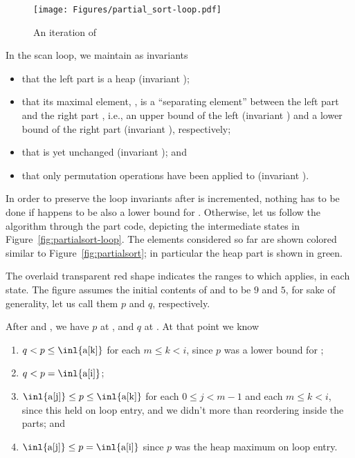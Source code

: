 \begin{figure}[hbt]
\begin{center}
\texttt{[image: Figures/partial\_sort-loop.pdf]}
\caption{An iteration of \partialsort}
\end{center}
\end{figure}

\clearpage

In the scan loop, we maintain as invariants
\begin{itemize}
\item that the left part is a heap (invariant );
\item that its maximal element, , is a ``separating element''
  between the left part  and the right part ,
  i.e., an upper bound of the left (invariant )
  and a lower bound of the right part (invariant ), respectively;
\item that  is yet unchanged (invariant ); and
\item that only permutation operations have been applied to
   (invariant ).
\end{itemize}

In order to preserve the loop invariants after  is incremented,
nothing has to be done if  happens to be
also a lower bound for .
Otherwise, let us follow the algorithm through the  part code,
depicting the intermediate states in 
Figure~\ref{fig:partialsort-loop}.
The elements considered so far are shown colored similar to
Figure~\ref{fig:partialsort}; in particular the heap part is shown in green.


%
The overlaid transparent red shape indicates the ranges to which
\Partition applies, in each state.
%
The figure assumes the initial contents of  and
 to be $9$ and $5$,
for sake of generality, let us
call them $p$ and $q$, respectively.

After \popheap and \swap,
we have $p$ at , and $q$ at .
%
At that point we know
%
\begin{enumerate}
\item $q < p \leq \mbox{\inl{a[k]}}$ for each $m \leq k < i$,
  since $p$ was a lower bound for ;
\item $q < p = \mbox{\inl{a[i]}}$;
\item $\mbox{\inl{a[j]}} \leq p \leq \mbox{\inl{a[k]}}$ 
  for each $0 \leq j < m-1$ and each $m \leq k < i$,
  since this held on loop entry, and we didn't more than
  reordering inside the parts; and
\item $\mbox{\inl{a[j]}} \leq p = \mbox{\inl{a[i]}}$ 
  since $p$ was the heap maximum on loop entry.
\end{enumerate}

